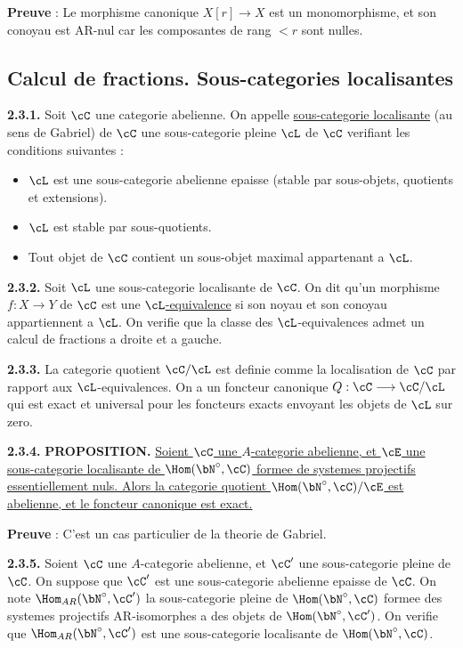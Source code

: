 \textbf{Preuve} : Le morphisme canonique $X[r] \longrightarrow X$ est un monomorphisme, et son conoyau est AR-nul car les composantes de rang $< r$ sont nulles.

\subsection{Calcul de fractions. Sous-categories localisantes}

\medskip
\noindent\textbf{2.3.1.} Soit $\cC$ une categorie abelienne. On appelle \underline{sous-categorie localisante} (au sens de Gabriel) de $\cC$ une sous-categorie pleine $\cL$ de $\cC$ verifiant les conditions suivantes :
\begin{itemize}
\item[(i)] $\cL$ est une sous-categorie abelienne epaisse (stable par sous-objets, quotients et extensions).
\item[(ii)] $\cL$ est stable par sous-quotients.
\item[(iii)] Tout objet de $\cC$ contient un sous-objet maximal appartenant a $\cL$.
\end{itemize}

\medskip
\noindent\textbf{2.3.2.} Soit $\cL$ une sous-categorie localisante de $\cC$. On dit qu'un morphisme $f : X \longrightarrow Y$ de $\cC$ est une \underline{$\cL$-equivalence} si son noyau et son conoyau appartiennent a $\cL$. On verifie que la classe des $\cL$-equivalences admet un calcul de fractions a droite et a gauche.

\medskip
\noindent\textbf{2.3.3.} La categorie quotient $\cC/\cL$ est definie comme la localisation de $\cC$ par rapport aux $\cL$-equivalences. On a un foncteur canonique $Q : \cC \longrightarrow \cC/\cL$ qui est exact et universal pour les foncteurs exacts envoyant les objets de $\cL$ sur zero.

\medskip
\noindent\textbf{2.3.4.} \textbf{PROPOSITION.} \underline{Soient $\cC$ une $A$-categorie abelienne, et $\cE$ une sous-categorie localisante de $\Hom(\bN^\circ, \cC)$ formee de systemes projectifs essentiellement nuls. Alors la categorie quotient $\Hom(\bN^\circ, \cC) / \cE$ est abelienne, et le foncteur canonique est exact.}

\textbf{Preuve} : C'est un cas particulier de la theorie de Gabriel.

\medskip
\noindent\textbf{2.3.5.} Soient $\cC$ une $A$-categorie abelienne, et $\cC'$ une sous-categorie pleine de $\cC$. On suppose que $\cC'$ est une sous-categorie abelienne epaisse de $\cC$. On note $\Hom_{AR}(\bN^\circ, \cC')$ la sous-categorie pleine de $\Hom(\bN^\circ, \cC)$ formee des systemes projectifs AR-isomorphes a des objets de $\Hom(\bN^\circ, \cC')$. On verifie que $\Hom_{AR}(\bN^\circ, \cC')$ est une sous-categorie localisante de $\Hom(\bN^\circ, \cC)$.

